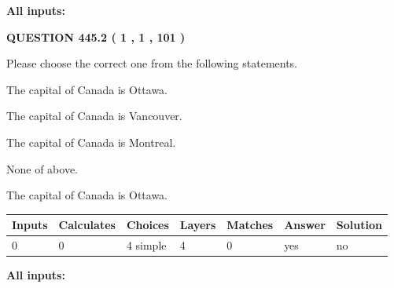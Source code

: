 \documentclass[12pt]{article}
\begin{document}
   
   
   
\noindent{}
   
   
   
   
\noindent\vspace{0.1in}\hspace{-0.08in} {\textbf{\Large{All inputs: }}}
   
   
  
\vspace{0.2in}
  
{\textbf{\Large{QUESTION
445.2 
 ( 1 , 1 , 101 )
}}}
  
  
Please choose the correct one from the following statements.
 
 
The capital of Canada is Ottawa.
 
 
The capital of Canada is Vancouver.
 
 
The capital of Canada is Montreal.
 
 
 None of above.
 
 
\noindent{}
 
 
The capital of Canada is Ottawa.
 
 
\noindent{}
 
 
   
   
   
   
\noindent\begin{tabular}{|l|l|l|l|l|l|l|}
 \hline
Inputs & Calculates & Choices & Layers & Matches & Answer & Solution \\ \hline
 0  & 
 0  & 
 4
  simple  
  & 
 4  & 
 0  & 
  yes & 
  no 
  \\ \hline
 \end{tabular}
   
   
   
   
\noindent{}
   
   
   
   
\noindent\vspace{0.1in}\hspace{-0.08in} {\textbf{\Large{All inputs: }}}
   
\end{document}
